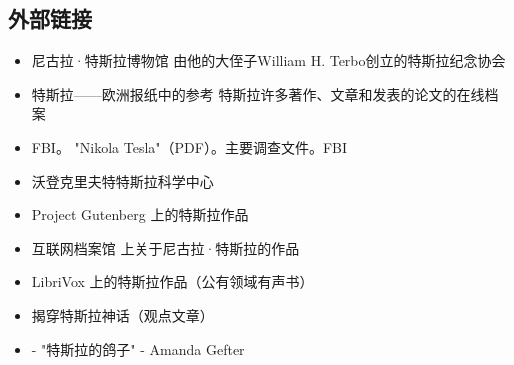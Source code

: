 \subsection{外部链接}
\begin{itemize}
\item 尼古拉·特斯拉博物馆  
由他的大侄子William H. Terbo创立的特斯拉纪念协会  
\item 特斯拉——欧洲报纸中的参考  
特斯拉许多著作、文章和发表的论文的在线档案  
\item FBI。 "Nikola Tesla"（PDF）。主要调查文件。FBI  
\item 沃登克里夫特特斯拉科学中心  
\item Project Gutenberg 上的特斯拉作品  
\item 互联网档案馆 上关于尼古拉·特斯拉的作品  
\item LibriVox 上的特斯拉作品（公有领域有声书）  
\item 揭穿特斯拉神话（观点文章）  
\item - "特斯拉的鸽子" - Amanda Gefter
\end{itemize}
